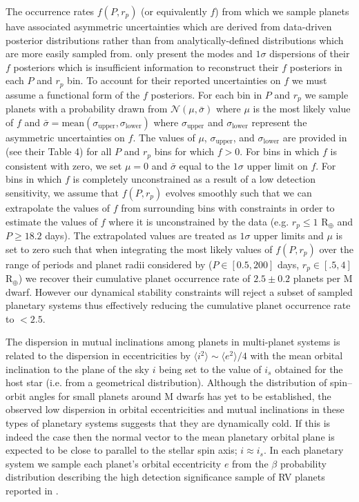 The occurrence rates $f(P,r_p)$ (or equivalently $f$) from which we sample planets have
associated asymmetric uncertainties which are derived from data-driven posterior distributions
rather than from analytically-defined distributions which are more easily sampled from. \cite{dressing15a}
only present the modes and $1\sigma$ dispersions of their $f$ posteriors which is insufficient information
to reconstruct their $f$ posteriors in each $P$ and $r_p$ bin. To account for their reported uncertainties on
$f$ we must assume a functional form of the $f$ posteriors.
For each bin in $P$ and $r_p$ we sample planets with a probability drawn
from $\mathcal{N}(\mu, \bar{\sigma})$ where $\mu$ is the most likely value
of $f$ and $\bar{\sigma} = \text{mean}(\sigma_{\text{upper}},\sigma_{\text{lower}})$ where
$\sigma_{\text{upper}}$ and $\sigma_{\text{lower}}$ represent the asymmetric uncertainties on $f$.
The values of $\mu$, $\sigma_{\text{upper}}$, and $\sigma_{\text{lower}}$ are provided in \cite{dressing15a}
(see their Table 4) for all $P$ and $r_p$ bins for which $f>0$. For bins in which $f$ is consistent with zero,
we set $\mu=0$ and $\bar{\sigma}$ equal to the $1\sigma$ upper limit on $f$. For bins in
which $f$ is completely unconstrained as a result of a low detection sensitivity, we assume that $f(P,r_p)$ 
evolves smoothly such that we can extrapolate the values of $f$ from surrounding
bins with constraints in order to estimate the values of $f$ where it is unconstrained by the data
(e.g. $r_p \leq 1$ R$_{\oplus}$ and $P \geq 18.2$ days).
The extrapolated values are treated as $1\sigma$ upper limits and $\mu$ is set to zero such that when
integrating the most likely values of
$f(P,r_p)$ over the range of periods and planet radii considered by \citealt{dressing15a} ($P \in [0.5,200]$ days,
$r_p \in [.5,4]$ R$_{\oplus}$) we recover their cumulative
planet occurrence rate of $2.5 \pm 0.2$ planets per M dwarf. However our dynamical stability constraints will
reject a subset of sampled planetary systems thus effectively reducing the cumulative planet occurrence rate to
$<2.5$.

The dispersion in mutual inclinations among planets in multi-planet 
systems is related to the dispersion in eccentricities by $\langle i^2 \rangle \sim \langle e^2 \rangle /4$ 
\citep{stewart00, quillen07} with the mean orbital inclination 
to the plane of the sky $i$ being set to the value of $i_s$ obtained for the host star (i.e. from a geometrical
distribution). Although the distribution of spin--orbit angles for small planets around
M dwarfs has yet to be established, the observed low dispersion in orbital eccentricities \citep{vaneylen15}
and mutual inclinations \citep{figueira12, fabrycky14} in these types of planetary systems suggests that
they are dynamically cold. If this is indeed the case then the normal vector
to the mean planetary orbital plane is expected to be close to parallel to the stellar spin axis; $i \approx i_s$.
In each planetary system we sample each planet's orbital eccentricity $e$ from the $\beta$ probability
distribution describing the high detection significance sample of RV planets reported in \cite{cloutier15}
\citep[see also ][]{kipping13}. 

